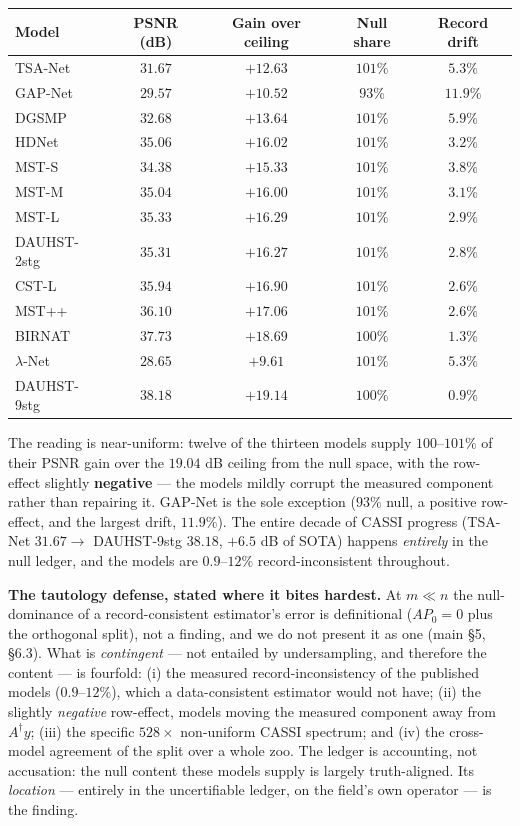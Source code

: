 \documentclass[11pt]{article}
\begin{document}
\begin{center}\begin{tabular}{lcccc}
\toprule
Model & PSNR (dB) & Gain over ceiling & Null share & Record drift \\
\midrule
TSA-Net & $31.67$ & $+12.63$ & $101\%$ & $5.3\%$ \\
GAP-Net & $29.57$ & $+10.52$ & $93\%$ & $11.9\%$ \\
DGSMP & $32.68$ & $+13.64$ & $101\%$ & $5.9\%$ \\
HDNet & $35.06$ & $+16.02$ & $101\%$ & $3.2\%$ \\
MST-S & $34.38$ & $+15.33$ & $101\%$ & $3.8\%$ \\
MST-M & $35.04$ & $+16.00$ & $101\%$ & $3.1\%$ \\
MST-L & $35.33$ & $+16.29$ & $101\%$ & $2.9\%$ \\
DAUHST-2stg & $35.31$ & $+16.27$ & $101\%$ & $2.8\%$ \\
CST-L & $35.94$ & $+16.90$ & $101\%$ & $2.6\%$ \\
MST++ & $36.10$ & $+17.06$ & $101\%$ & $2.6\%$ \\
BIRNAT & $37.73$ & $+18.69$ & $100\%$ & $1.3\%$ \\
$\lambda$-Net & $28.65$ & $+9.61$ & $101\%$ & $5.3\%$ \\
DAUHST-9stg & $38.18$ & $+19.14$ & $100\%$ & $0.9\%$ \\
\bottomrule
\end{tabular}\end{center}

The reading is near-uniform: twelve of the thirteen models supply $100$--$101\%$ of their PSNR gain over the $19.04$ dB ceiling from the null space, with the row-effect slightly \textbf{negative} --- the models mildly corrupt the measured component rather than repairing it. GAP-Net is the sole exception ($93\%$ null, a positive row-effect, and the largest drift, $11.9\%$). The entire decade of CASSI progress (TSA-Net $31.67\to$ DAUHST-9stg $38.18$, $+6.5$ dB of SOTA) happens \textit{entirely} in the null ledger, and the models are $0.9$--$12\%$ record-inconsistent throughout.

\textbf{The tautology defense, stated where it bites hardest.} At $m\ll n$ the null-dominance of a record-consistent estimator's error is definitional ($AP_0=0$ plus the orthogonal split), not a finding, and we do not present it as one (main §5, §6.3). What is \textit{contingent} --- not entailed by undersampling, and therefore the content --- is fourfold: (i) the measured record-inconsistency of the published models ($0.9$--$12\%$), which a data-consistent estimator would not have; (ii) the slightly \textit{negative} row-effect, models moving the measured component away from $A^\dagger y$; (iii) the specific $528\times$ non-uniform CASSI spectrum; and (iv) the cross-model agreement of the split over a whole zoo. The ledger is accounting, not accusation: the null content these models supply is largely truth-aligned. Its \textit{location} --- entirely in the uncertifiable ledger, on the field's own operator --- is the finding.
\end{document}
